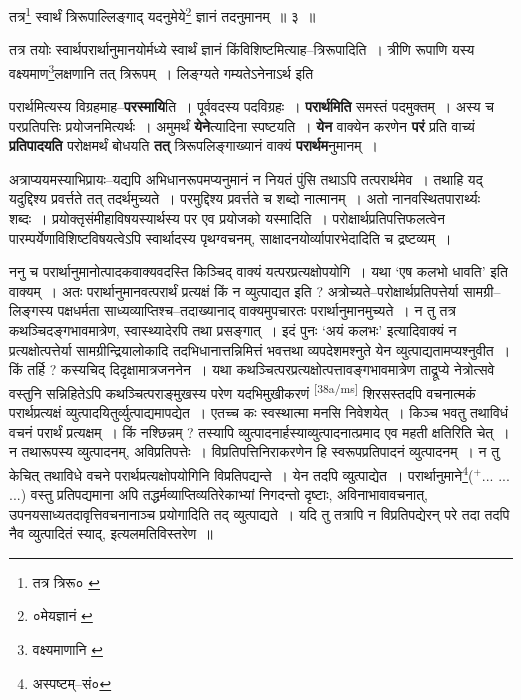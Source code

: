 \documentclass[article,12pt,a4paper]{memoir}
\newcommand{\add}[1]{($^{+}$#1)}
\begin{document}
	  \pstart तत्र\footnote{तत्र त्रिरू० \cite{dp-edE}} स्वार्थं त्रिरूपाल्लिङ्गाद् यदनुमेये\footnote{०मेयज्ञानं \cite{dp-msC}} ज्ञानं तदनुमानम् ॥ ३ ॥
	\pend
      

	  \pstart तत्र तयोः स्वार्थपरार्थानुमानयोर्मध्ये स्वार्थं ज्ञानं किंविशिष्टमित्याह--त्रिरूपादिति । त्रीणि रूपाणि यस्य वक्ष्यमाण\footnote{वक्ष्यमाणानि \cite{dp-msD}}लक्षणानि तत् त्रिरूपम् । लिङ्ग्यते गम्यतेऽनेनाऽर्थ इति
	\pend
      

	  \pstart परार्थमित्यस्य विग्रहमाह--\textbf{परस्मायि}ति । पूर्ववदस्य पदविग्रहः । \textbf{परार्थमिति} समस्तं पदमुक्तम् । अस्य च परप्रतिपत्तिः प्रयोजनमित्यर्थः । अमुमर्थं \textbf{येने}त्यादिना स्पष्टयति । \textbf{येन} वाक्येन करणेन \textbf{परं} प्रति वाच्यं \textbf{प्रतिपादयति} परोक्षमर्थं बोधयति \textbf{तत्} त्रिरूपलिङ्गाख्यानं वाक्यं \textbf{परार्थम}नुमानम् ।
	\pend
      

	  \pstart अत्राप्ययमस्याभिप्रायः--यद्यपि अभिधानरूपमप्यनुमानं न नियतं पुंसि तथाऽपि तत्परार्थमेव । तथाहि यद् यदुद्दिश्य प्रवर्त्तते तत् तदर्थमुच्यते । परमुद्दिश्य प्रवर्त्तते च शब्दो नात्मानम् । अतो नानवस्थितपारार्थ्यः शब्दः । प्रयोक्तृसंमीहाविषयस्यार्थस्य पर एव प्रयोजको यस्मादिति । परोक्षार्थप्रतिपत्तिफलत्वेन पारम्पर्येणाविशिष्टविषयत्वेऽपि स्वार्थादस्य पृथग्वचनम्, साक्षादनयोर्व्यापारभेदादिति च द्रष्टव्यम् ।
	\pend
      

	  \pstart ननु च परार्थानुमानोत्पादकवाक्यवदस्ति किञ्चिद् वाक्यं यत्परप्रत्यक्षोपयोगि । यथा ‘एष कलभो धावति’ इति वाक्यम् । अतः परार्थानुमानवत्परार्थं प्रत्यक्षं किं न व्युत्पाद्यत इति ? अत्रोच्यते--परोक्षार्थप्रतिपत्तेर्या सामग्री--लिङ्गस्य पक्षधर्मता साध्यव्याप्तिश्च--तदाख्यानाद् वाक्यमुपचारतः परार्थानुमानमुच्यते । न तु तत्र कथञ्चिदङ्गभावमात्रेण, स्वास्थ्यादेरपि तथा प्रसङ्गात् । इदं पुनः ‘अयं कलभः’ इत्यादिवाक्यं न प्रत्यक्षोत्पत्तेर्या सामग्रीन्द्रियालोकादि तदभिधानात्तन्निमित्तं भवत्तथा व्यपदेशमश्नुते येन व्युत्पाद्यतामप्यश्नुवीत । किं तर्हि ? कस्यचिद् दिदृक्षामात्रजननेन । यथा कथञ्चित्परप्रत्यक्षोत्पत्तावङ्गभावमात्रेण ताद्रूप्ये नेत्रोत्सवे वस्तुनि सन्निहितेऽपि कथञ्चित्पराङ्मुखस्य परेण यदभिमुखीकरणं \leavevmode\textsuperscript{\rmlatinfont\tiny [38a/ms]} शिरसस्तदपि वचनात्मकं परार्थप्रत्यक्षं व्युत्पादयितुर्व्युत्पाद्यमापद्येत । एतच्च कः स्वस्थात्मा मनसि निवेशयेत् । किञ्च भवतु तथाविधं वचनं परार्थं प्रत्यक्षम् । किं नश्छिन्नम् ? तस्यापि व्युत्पादनार्हस्याव्युत्पादनात्प्रमाद एव महती क्षतिरिति चेत् । न तथारूपस्य व्युत्पादनम्, अविप्रतिपत्तेः । विप्रतिपत्तिनिराकरणेन हि स्वरूपप्रतिपादनं व्युत्पादनम् । न तु केचित् तथाविधे वचने परार्थप्रत्यक्षोपयोगिनि विप्रतिपद्यन्ते । येन तदपि व्युत्पाद्येत । परार्थानुमाने\footnote{अस्पष्टम्--सं०}\add{... ... ...} वस्तु प्रतिपद्यमाना अपि तद्धर्मव्याप्तिव्यतिरेकाभ्यां निगदन्तो दृष्टाः, अविनाभावावचनात्, उपनयसाध्यतदावृत्तिवचनानाञ्च प्रयोगादिति तद् व्युत्पाद्यते । यदि तु तत्रापि न विप्रतिपद्येरन् परे तदा तदपि नैव व्युत्पादितं स्याद्, इत्यलमतिविस्तरेण ॥
	\pend
      
\end{document}
